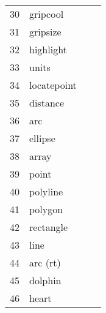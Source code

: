 \begin{longtable}{l l l p{8cm}}
30 & gripcool &  & \\
31 & gripsize &  & \\
32 & highlight &  & \\
33 & units &  & \\
34 & locatepoint &  & \\
35 & distance &  & \\
36 & arc &  & \\
37 & ellipse &  & \\
38 & array &  & \\
39 & point &  & \\
40 & polyline &  & \\
41 & polygon &  & \\
42 & rectangle &  & \\
43 & line &  & \\
44 & arc (rt) &  & \\
45 & dolphin &  & \\
46 & heart &  &
\end{longtable}

